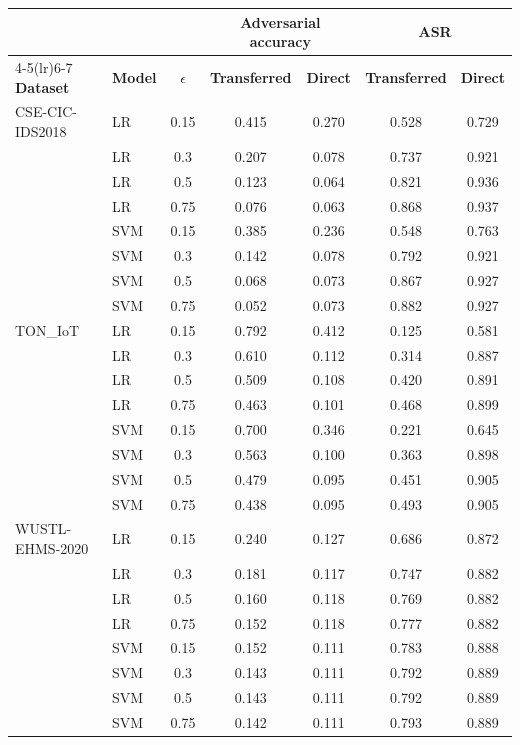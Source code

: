 \begin{tabular}{l l c c c c c}
\toprule
& & & \multicolumn{2}{c}{\textbf{Adversarial accuracy}} & \multicolumn{2}{c}{\textbf{ASR}} \\
\cmidrule(lr){4-5}\cmidrule(lr){6-7}
\textbf{Dataset} & \textbf{Model} & $\epsilon$ & \textbf{Transferred} & \textbf{Direct} & \textbf{Transferred} & \textbf{Direct} \\
\midrule
CSE-CIC-IDS2018 & LR & 0.15 & 0.415 & 0.270 & 0.528 & 0.729 \\
 & LR & 0.3 & 0.207 & 0.078 & 0.737 & 0.921 \\
 & LR & 0.5 & 0.123 & 0.064 & 0.821 & 0.936 \\
 & LR & 0.75 & 0.076 & 0.063 & 0.868 & 0.937 \\
 & SVM & 0.15 & 0.385 & 0.236 & 0.548 & 0.763 \\
 & SVM & 0.3 & 0.142 & 0.078 & 0.792 & 0.921 \\
 & SVM & 0.5 & 0.068 & 0.073 & 0.867 & 0.927 \\
 & SVM & 0.75 & 0.052 & 0.073 & 0.882 & 0.927 \\
TON\_IoT & LR & 0.15 & 0.792 & 0.412 & 0.125 & 0.581 \\
 & LR & 0.3 & 0.610 & 0.112 & 0.314 & 0.887 \\
 & LR & 0.5 & 0.509 & 0.108 & 0.420 & 0.891 \\
 & LR & 0.75 & 0.463 & 0.101 & 0.468 & 0.899 \\
 & SVM & 0.15 & 0.700 & 0.346 & 0.221 & 0.645 \\
 & SVM & 0.3 & 0.563 & 0.100 & 0.363 & 0.898 \\
 & SVM & 0.5 & 0.479 & 0.095 & 0.451 & 0.905 \\
 & SVM & 0.75 & 0.438 & 0.095 & 0.493 & 0.905 \\
WUSTL-EHMS-2020 & LR & 0.15 & 0.240 & 0.127 & 0.686 & 0.872 \\
 & LR & 0.3 & 0.181 & 0.117 & 0.747 & 0.882 \\
 & LR & 0.5 & 0.160 & 0.118 & 0.769 & 0.882 \\
 & LR & 0.75 & 0.152 & 0.118 & 0.777 & 0.882 \\
 & SVM & 0.15 & 0.152 & 0.111 & 0.783 & 0.888 \\
 & SVM & 0.3 & 0.143 & 0.111 & 0.792 & 0.889 \\
 & SVM & 0.5 & 0.143 & 0.111 & 0.792 & 0.889 \\
 & SVM & 0.75 & 0.142 & 0.111 & 0.793 & 0.889 \\
\bottomrule
\end{tabular}

